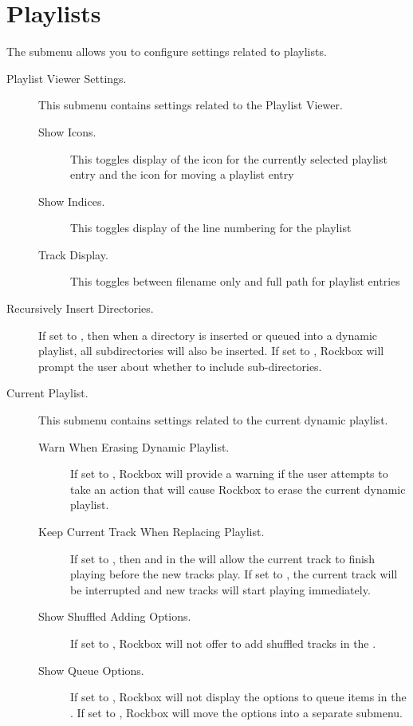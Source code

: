 \section{\label{ref:PlaylistOptions}Playlists}

The  submenu allows you to configure settings
related to playlists.


\begin{description}

\item[Playlist Viewer Settings.]
   This submenu contains settings related to the Playlist Viewer.
   \begin{description}
    \item[Show Icons.] This toggles display of the icon for the currently
    selected playlist entry and the icon for moving a playlist entry
    \item[Show Indices.] This toggles display of the line numbering for
       the playlist
    \item[Track Display.] This toggles between filename only and full path
       for playlist entries
  \end{description}

\item[Recursively Insert Directories.]
  If set to , then when a directory is inserted or queued into a
  dynamic playlist, all subdirectories will also be inserted. If set to ,
  Rockbox will prompt the user about whether to include sub-directories.

\item[Current Playlist.]
  This submenu contains settings related to the current dynamic playlist.
  \begin{description}

  \item[Warn When Erasing Dynamic Playlist.]
  If set to , Rockbox will provide a warning if the user attempts to
  take an action that will cause Rockbox to erase the current dynamic playlist.

  \item[Keep Current Track When Replacing Playlist.]
  If set to , then  and  in
  the  will allow the current track to finish
  playing before the new tracks play. If set to , the current
  track will be interrupted and new tracks will start playing immediately.

  \item[Show Shuffled Adding Options.]
  If set to , Rockbox will not offer to add shuffled tracks
  in the .

  \item[Show Queue Options.]
  If set to , Rockbox will not display the options to queue items in
  the .
  If set to , Rockbox will move the options into a
  separate submenu.

  \end{description}

\end{description}
